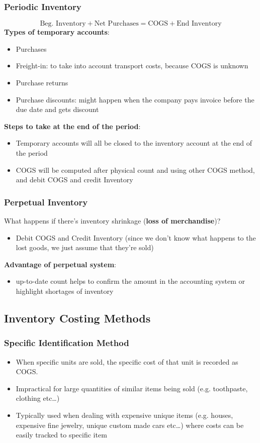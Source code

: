\documentclass{article}
\begin{document}
\begin{multicols}{2}
\subsubsection{Periodic Inventory}
$$\text{Beg. Inventory} + \text{Net Purchases} = \text{COGS} + \text{End Inventory}$$
\textbf{Types of temporary accounts}:
\begin{itemize}
	\item Purchases
	\item Freight-in: to take into account transport costs, because COGS is unknown
	\item Purchase returns
	\item Purchase discounts: might happen when the company pays invoice before the due date and gets discount
\end{itemize}
\textbf{Steps to take at the end of the period}:
\begin{itemize}
	\item Temporary accounts will all be closed to the inventory account at the end of the period
	\item COGS will be computed after physical count and using other COGS method, and debit COGS and credit Inventory
\end{itemize}

\subsubsection{Perpetual Inventory}
What happens if there's inventory shrinkage (\textbf{loss of merchandise})?
\begin{itemize}
	\item Debit COGS and Credit Inventory (since we don't know what happens to the lost goods, we just assume that they're sold)
\end{itemize}
\textbf{Advantage of perpetual system}:
\begin{itemize}
	\item up-to-date count helps to confirm the amount in the accounting system or highlight shortages of inventory
\end{itemize}

\subsection{Inventory Costing Methods}

\subsubsection{Specific Identification Method}
\begin{itemize}
	\item When specific units are sold, the specific cost of that unit is recorded as COGS.
	\item Impractical for large quantities of similar items being sold (e.g. toothpaste, clothing etc…)
	\item Typically used when dealing with expensive unique items (e.g. houses, expensive fine jewelry, unique custom made cars etc…) where costs can be easily tracked to specific item
\end{itemize}

\end{multicols}
\end{document}
